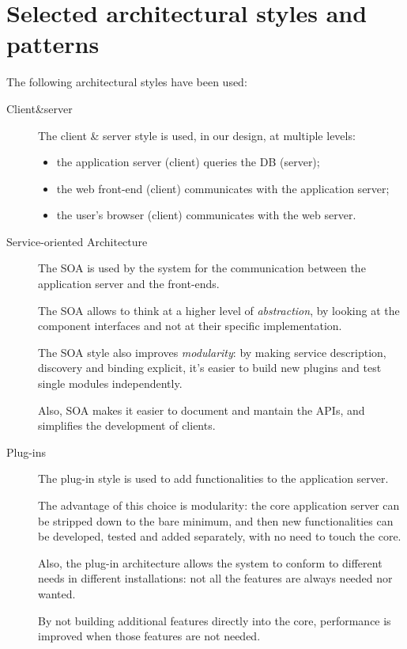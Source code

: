 \section{Selected architectural styles and patterns}
\label{sec:styles-patterns}

The following architectural styles have been used:

\begin{description}
\item[Client\&server]
The client \& server style is used, in our design, at multiple levels:
\begin{itemize}
    \item the application server (client) queries the DB (server);
    \item the web front-end (client) communicates with the application server;
    \item the user's browser (client) communicates with the web server.
\end{itemize}

\item[Service-oriented Architecture]
The SOA is used by the system for the communication between the application server and the front-ends.

The SOA allows to think at a higher level of \emph{abstraction}, by looking at the component interfaces and not at their specific implementation.

The SOA style also improves \emph{modularity}: by making service description, discovery and binding explicit, it's easier to build new plugins and test single modules independently.

Also, SOA makes it easier to document and mantain the APIs, and simplifies the development of clients.

\item[Plug-ins]
The plug-in style is used to add functionalities to the application server.

The advantage of this choice is modularity: the core application server can be stripped down to the bare minimum, and then new functionalities can be developed, tested and added separately, with no need to touch the core.

Also, the plug-in architecture allows the system to conform to different needs in different installations: not all the features are always needed nor wanted.

By not building additional features directly into the core, performance is improved when those features are not needed.


\end{description}
